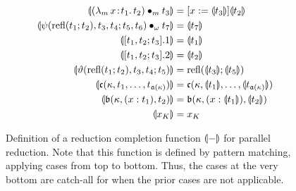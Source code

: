 

\begin{figure}
    \centering
    \begin{align*}
        \llparenthesis {({\lambda_m}\, x\! : \! t_1.\, t_2) \bullet_{m} t_3} \rrparenthesis &= [x := \llparenthesis {t_3} \rrparenthesis]\llparenthesis {t_2} \rrparenthesis \\
        \llparenthesis {\psi(\text{refl}(t_1; t_2), t_3, t_4; t_5, t_6) \bullet_{\omega} t_7} \rrparenthesis &= \llparenthesis {t_7} \rrparenthesis \\
        \llparenthesis {[t_1, t_2; t_3].1} \rrparenthesis &= \llparenthesis {t_1} \rrparenthesis \\
        \llparenthesis {[t_1, t_2; t_3].2} \rrparenthesis &= \llparenthesis {t_2} \rrparenthesis \\
        \llparenthesis {\vartheta(\text{refl}(t_1; t_2), t_3, t_4; t_5)} \rrparenthesis &= \text{refl}(\llparenthesis {t_3} \rrparenthesis; \llparenthesis {t_5} \rrparenthesis) \\
        \llparenthesis {\mathfrak{c}(\kappa, t_1, \ldots, t_{\mathfrak{a}(\kappa)})} \rrparenthesis &= \mathfrak{c}(\kappa, \llparenthesis {t_1} \rrparenthesis, \ldots, \llparenthesis {t_{\mathfrak{a}(\kappa)}} \rrparenthesis) \\
        \llparenthesis {\mathfrak{b}(\kappa, (x : t_1), t_2)} \rrparenthesis &= \mathfrak{b}(\kappa, (x : \llparenthesis {t_1} \rrparenthesis), \llparenthesis {t_2} \rrparenthesis) \\
        \llparenthesis {x_K} \rrparenthesis &= x_K
    \end{align*}
    \caption{
        Definition of a reduction completion function $\llparenthesis {-} \rrparenthesis$ for parallel reduction.
        Note that this function is defined by pattern matching, applying cases from top to bottom.
        Thus, the cases at the very bottom are catch-all for when the prior cases are not applicable.
    }
    \label{fig:par-triangle}
\end{figure}
